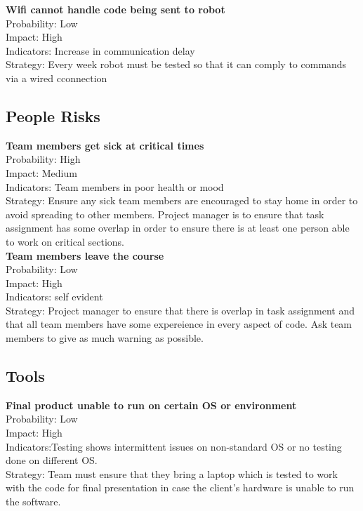\documentclass[11pt, a4paper]{article}
\begin{document}
			\textbf{Wifi cannot handle code being sent to robot}\\
			Probability: Low\\
			Impact: High\\
			Indicators: Increase in communication delay\\
			Strategy: Every week robot must be tested so that it can comply to commands via a wired cconnection

			\subsection*{People Risks}
			\textbf{Team members get sick at critical times}\\
			Probability: High\\
			Impact: Medium\\
			Indicators: Team members in poor health or mood\\
			Strategy: Ensure any sick team members are encouraged to stay home in order to avoid spreading to other members. Project manager is to ensure that task assignment has some overlap in order to ensure there is at least one person able to work on critical sections.\\
			
			\textbf{Team members leave the course}\\
			Probability: Low\\
			Impact: High\\
			Indicators: self evident\\
			Strategy: Project manager to ensure that there is overlap in task assignment and that all team members have some expereience in every aspect of code. Ask team members to give as much warning as possible.\\

			\subsection*{Tools}

			\textbf{Final product unable to run on certain OS or environment}\\
			Probability: Low\\
			Impact: High\\
			Indicators:Testing shows intermittent issues on non-standard OS or no testing done on different OS.\\
			Strategy: Team must ensure that they bring a laptop which is tested to work with the code for final presentation in case the client's hardware is unable to run the software.\\
\end{document}
